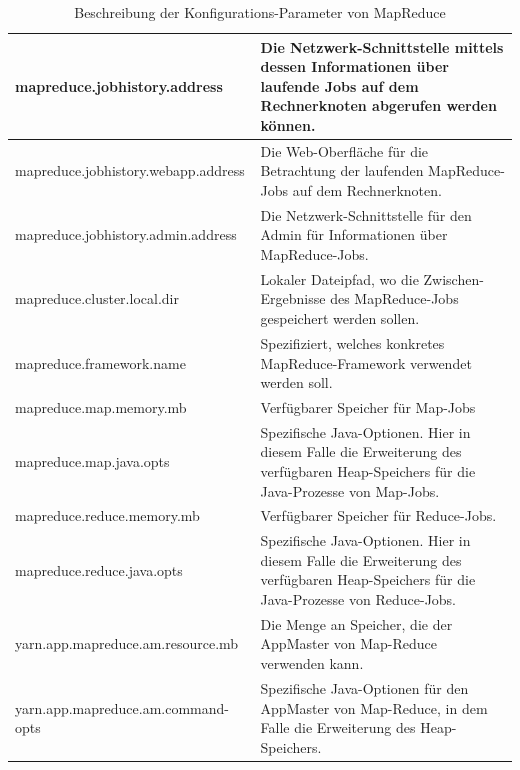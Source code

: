 \begin{table}
	\begin{tabularx}{\textwidth}{| X | X |} \hline
	mapreduce.jobhistory.address & Die Netzwerk-Schnittstelle mittels dessen Informationen
	über laufende Jobs auf dem Rechnerknoten abgerufen werden können. \\ \hline
	mapreduce.jobhistory.webapp.address & Die Web-Oberfläche für die Betrachtung
	der laufenden MapReduce-Jobs auf dem Rechnerknoten.\\ \hline
	mapreduce.jobhistory.admin.address & Die Netzwerk-Schnittstelle für den Admin für
	Informationen über MapReduce-Jobs.\\ \hline
	mapreduce.cluster.local.dir &  Lokaler Dateipfad, wo die Zwischen-Ergebnisse des MapReduce-Jobs gespeichert werden sollen.\\ \hline
	mapreduce.framework.name &  Spezifiziert, welches konkretes MapReduce-Framework
	verwendet werden soll. \\ \hline
	mapreduce.map.memory.mb &  Verfügbarer Speicher für Map-Jobs\\ \hline
	mapreduce.map.java.opts & Spezifische Java-Optionen. Hier in diesem Falle die Erweiterung
	des verfügbaren Heap-Speichers für die Java-Prozesse von Map-Jobs.\\ \hline
	mapreduce.reduce.memory.mb &  Verfügbarer Speicher für Reduce-Jobs.\\ \hline
	mapreduce.reduce.java.opts & Spezifische Java-Optionen. Hier in diesem Falle die Erweiterung
	des verfügbaren Heap-Speichers für die Java-Prozesse von Reduce-Jobs. \\ \hline
	yarn.app.mapreduce.am.resource.mb & Die Menge an Speicher, die der AppMaster von
	Map-Reduce verwenden kann. \\ \hline
	yarn.app.mapreduce.am.command-opts &  Spezifische Java-Optionen für den AppMaster
	von Map-Reduce, in dem Falle die Erweiterung des Heap-Speichers.\\ \hline
	\end{tabularx}
	\caption{Beschreibung der Konfigurations-Parameter von MapReduce}
	\label{config:mapreduceDescription}
\end{table}


